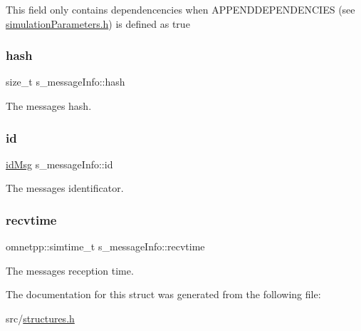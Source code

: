 This field only contains dependencencies when A\+P\+P\+E\+N\+D\+D\+E\+P\+E\+N\+D\+E\+N\+C\+I\+ES (see \hyperlink{simulation_parameters_8h}{simulation\+Parameters.\+h}) is defined as true \mbox{\label{structs__message_info_a9b627c36e814fbbd04a89bc6e827e4ff}} 
\subsubsection{\texorpdfstring{hash}{hash}}
{\footnotesize\ttfamily size\+\_\+t s\+\_\+message\+Info\+::hash}



The message\textquotesingle{}s hash. 

\mbox{\label{structs__message_info_a6c2928774199848fd25b4e8ffb7870c2}} 
\subsubsection{\texorpdfstring{id}{id}}
{\footnotesize\ttfamily \hyperlink{structures_8h_a83a1d9a070efa5341da84cfd8e28d3e5}{id\+Msg} s\+\_\+message\+Info\+::id}



The message\textquotesingle{}s identificator. 

\mbox{\label{structs__message_info_a3600b24205dc07ce06774af44976c107}} 
\subsubsection{\texorpdfstring{recvtime}{recvtime}}
{\footnotesize\ttfamily omnetpp\+::simtime\+\_\+t s\+\_\+message\+Info\+::recvtime}



The message\textquotesingle{}s reception time. 



The documentation for this struct was generated from the following file\+:\begin{DoxyCompactItemize}
\item 
src/\hyperlink{structures_8h}{structures.\+h}\end{DoxyCompactItemize}
